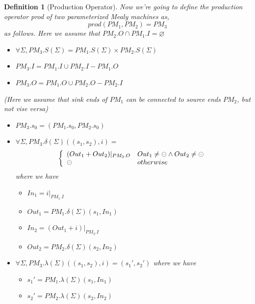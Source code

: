 \documentclass[conference, a4paper]{IEEEtran}
\newtheorem{definition}{Definition}
\newcommand{\rblock}[0]{\circleddash}
\begin{document}
\begin{definition}[Production Operator]
  Now we're going to define the production operator \emph{prod} of two parameterized Mealy machines as,
  \[
  prod(PM_1,PM_2)=PM_3
  \]
  as follows. Here we assume that $PM_2.O\cap PM_1.I=\varnothing$
  \begin{itemize}
  	\item[-] $\forall\Sigma, PM_3.S(\Sigma)=PM_1.S(\Sigma)\times PM_2.S(\Sigma)$
    \item[-] $PM_3.I=PM_1.I\cup PM_2.I-PM_1.O$
    \item[-] $PM_3.O=PM_1.O\cup PM_2.O-PM_2.I$
  \end{itemize}
  \emph{(Here we assume that sink ends of $PM_1$ can be connected to source ends $PM_2$, but not
  vise versa)}
  \begin{itemize}
    \item[-] $PM_3.s_0=(PM_1.s_0, PM_2.s_0)$
    \item[-] $\forall\Sigma, PM_3.\delta(\Sigma)((s_1,s_2), i)=$
      \begin{displaymath}
        \left\{
        \begin{array}[h]{ll}
          (Out_1 + Out_2)|_{PM_3.O} & Out_1\neq\rblock\land Out_2\neq\rblock \\
          \rblock & otherwise \\
        \end{array}
        \right.
      \end{displaymath}
      where we have
      \begin{itemize}
        \item[*] $In_1 = i|_{PM_1.I}$
        \item[*] $Out_1 = PM_1.\delta(\Sigma)(s_1,In_1)$
        \item[*] $In_2 = (Out_1 + i)|_{PM_2.I}$
        \item[*] $Out_2 = PM_2.\delta(\Sigma)(s_2,In_2)$
      \end{itemize}
    \item[-] $\forall\Sigma, PM_3. \lambda(\Sigma)((s_1,s_2),i)=(s_1',s_2')$
      where we have
      \begin{itemize}
        \item[*] $s_1' = PM_1.\lambda(\Sigma)(s_1,In_1)$
        \item[*] $s_2' = PM_2.\lambda(\Sigma)(s_2,In_2)$
      \end{itemize}
  \end{itemize}
\end{definition}
\end{document}

